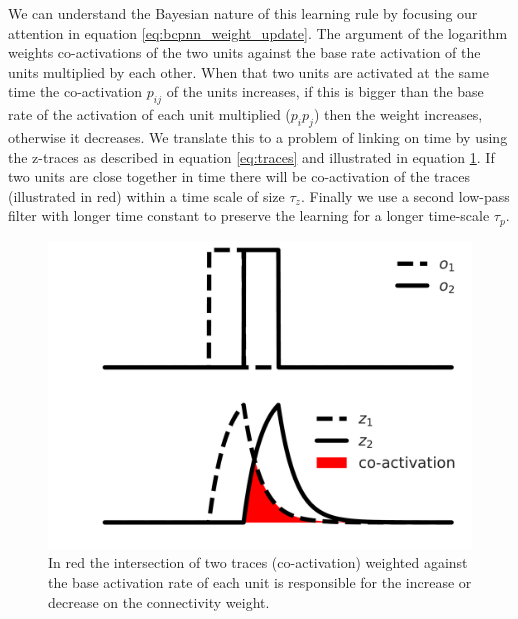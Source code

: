 \documentclass[10pt,a4paper]{article}
\begin{document}
We can understand the Bayesian nature of this learning rule by focusing our attention in equation \ref{eq:bcpnn_weight_update}. The argument of the logarithm weights co-activations of the two units against the base rate activation of the units multiplied by each other. When that two units are activated at the same time the co-activation $p_{ij}$ of the units increases, if this is bigger than the  base rate of the activation of each unit multiplied ($p_i p_j$) then the weight increases, otherwise it decreases. We translate this to a problem of linking on time by using the z-traces as described in equation \ref{eq:traces} and illustrated in equation \ref{fig:traces_example}. If two units are close together in time there will be co-activation of the traces (illustrated in red) within a time scale of size $\tau_z$. Finally  we use a second low-pass filter  with longer time constant to preserve the learning for a longer time-scale $\tau_p$. 
\begin{flushleft}

\begin{figure}[H]
\centering
\includegraphics[scale=0.30]{traces_example.pdf}
\caption{In red the intersection of two traces (co-activation) weighted against the base activation rate of each unit is responsible for the increase or decrease on the connectivity weight.}
\label{fig:traces_example}
\end{figure}
\end{flushleft}
\end{document}
